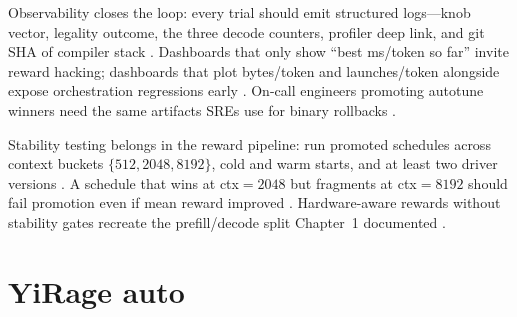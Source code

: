 Observability closes the loop: every trial should emit structured logs---knob vector, legality outcome, the three decode counters, profiler deep link, and git SHA of compiler stack \citep{patel2025llminference,yirage2026,chen2020compilerbasedhardw,memoryfloor2026,taxbreak2026,dlbook}. Dashboards that only show ``best ms/token so far'' invite reward hacking; dashboards that plot bytes/token and launches/token alongside expose orchestration regressions early \citep{taxbreak2026,memoryfloor2026,semianalysis2024tma,kwon2023vllm,liu2024deepseekv3,amd2024aie,amd2024xdna,dao2022flashattention,dao2023flashdecoding,nvidia2024cudagraphs,nvidia2022hopper,yirage2026,chen2020compilerbasedhardw,patel2025llminference,dlbook}. On-call engineers promoting autotune winners need the same artifacts SREs use for binary rollbacks \citep{patel2025llminference,yirage2026,memoryfloor2026,chen2020compilerbasedhardw,taxbreak2026,amd2024aie,dlbook,semianalysis2024tma,amd2024xdna,dao2022flashattention,dao2023flashdecoding,nvidia2024cudagraphs,nvidia2022hopper,kwon2023vllm,liu2024deepseekv3}.

Stability testing belongs in the reward pipeline: run promoted schedules across context buckets $\{512,2048,8192\}$, cold and warm starts, and at least two driver versions \citep{memoryfloor2026,nvidia2024cudagraphs,kwon2023vllm,patel2025llminference,yirage2026,chen2020compilerbasedhardw,taxbreak2026,amd2024aie,dlbook,semianalysis2024tma,amd2024xdna,dao2022flashattention,liu2024deepseekv3,dao2023flashdecoding,nvidia2022hopper,liu2024deepseekv3}. A schedule that wins at ctx${=}2048$ but fragments at ctx${=}8192$ should fail promotion even if mean reward improved \citep{memoryfloor2026,dao2022flashattention,kwon2023vllm,yirage2026,chen2020compilerbasedhardw,patel2025llminference,taxbreak2026,amd2024aie,dlbook,semianalysis2024tma,amd2024xdna,dao2023flashdecoding,nvidia2024cudagraphs,nvidia2022hopper,liu2024deepseekv3}. Hardware-aware rewards without stability gates recreate the prefill/decode split Chapter~1 documented \citep{patel2025llminference,taxbreak2026,memoryfloor2026,yirage2026,chen2020compilerbasedhardw,dlbook,amd2024aie,semianalysis2024tma,amd2024xdna,dao2022flashattention,dao2023flashdecoding,nvidia2024cudagraphs,nvidia2022hopper,kwon2023vllm,liu2024deepseekv3}.

\section{YiRage auto}
\label{sec:ch25_yirage_auto}

